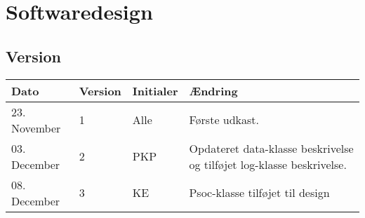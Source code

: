 \chapter{Softwaredesign}

\section*{Version}
\begin{table}[h]
	\centering
	\begin{tabularx}{\textwidth - 2cm}{|l|l|l|X|}
	\hline
	Dato			& Version		& Initialer 	& Ændring																	\\ \hline
	23. November	& 1 			& Alle			& Første udkast. 															\\ \hline
	03. December 	& 2 			& PKP			& Opdateret data-klasse beskrivelse og tilføjet log-klasse beskrivelse. 	\\ \hline
	08. December 	& 3 			& KE			& Psoc-klasse tilføjet til design 											\\ \hline
	\end{tabularx}
\end{table}
\clearpage



